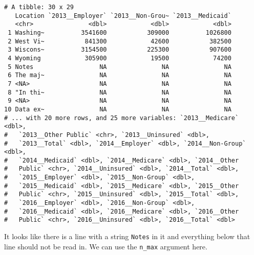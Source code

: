 \documentclass[]{article}
\newenvironment{Shaded}{\begin{snugshade}}{\end{snugshade}}
\newcommand{\DataTypeTok}[1]{\textcolor[rgb]{0.13,0.29,0.53}{#1}}
\newcommand{\DecValTok}[1]{\textcolor[rgb]{0.00,0.00,0.81}{#1}}
\newcommand{\KeywordTok}[1]{\textcolor[rgb]{0.13,0.29,0.53}{\textbf{#1}}}
\newcommand{\NormalTok}[1]{#1}
\newcommand{\OperatorTok}[1]{\textcolor[rgb]{0.81,0.36,0.00}{\textbf{#1}}}
\newcommand{\OtherTok}[1]{\textcolor[rgb]{0.56,0.35,0.01}{#1}}
\newcommand{\StringTok}[1]{\textcolor[rgb]{0.31,0.60,0.02}{#1}}
\begin{document}
\begin{verbatim}
# A tibble: 30 x 29
   Location `2013__Employer` `2013__Non-Grou~ `2013__Medicaid`
   <chr>               <dbl>            <dbl>            <dbl>
 1 Washing~          3541600           309000          1026800
 2 West Vi~           841300            42600           382500
 3 Wiscons~          3154500           225300           907600
 4 Wyoming            305900            19500            74200
 5 Notes                  NA               NA               NA
 6 The maj~               NA               NA               NA
 7 <NA>                   NA               NA               NA
 8 "In thi~               NA               NA               NA
 9 <NA>                   NA               NA               NA
10 Data ex~               NA               NA               NA
# ... with 20 more rows, and 25 more variables: `2013__Medicare` <dbl>,
#   `2013__Other Public` <chr>, `2013__Uninsured` <dbl>,
#   `2013__Total` <dbl>, `2014__Employer` <dbl>, `2014__Non-Group` <dbl>,
#   `2014__Medicaid` <dbl>, `2014__Medicare` <dbl>, `2014__Other
#   Public` <chr>, `2014__Uninsured` <dbl>, `2014__Total` <dbl>,
#   `2015__Employer` <dbl>, `2015__Non-Group` <dbl>,
#   `2015__Medicaid` <dbl>, `2015__Medicare` <dbl>, `2015__Other
#   Public` <chr>, `2015__Uninsured` <dbl>, `2015__Total` <dbl>,
#   `2016__Employer` <dbl>, `2016__Non-Group` <dbl>,
#   `2016__Medicaid` <dbl>, `2016__Medicare` <dbl>, `2016__Other
#   Public` <chr>, `2016__Uninsured` <dbl>, `2016__Total` <dbl>
\end{verbatim}

It looks like there is a line with a string \texttt{Notes} in it and
everything below that line should not be read in. We can use the
\texttt{n\_max} argument here.

\begin{Shaded}
\end{Shaded}
\end{document}

